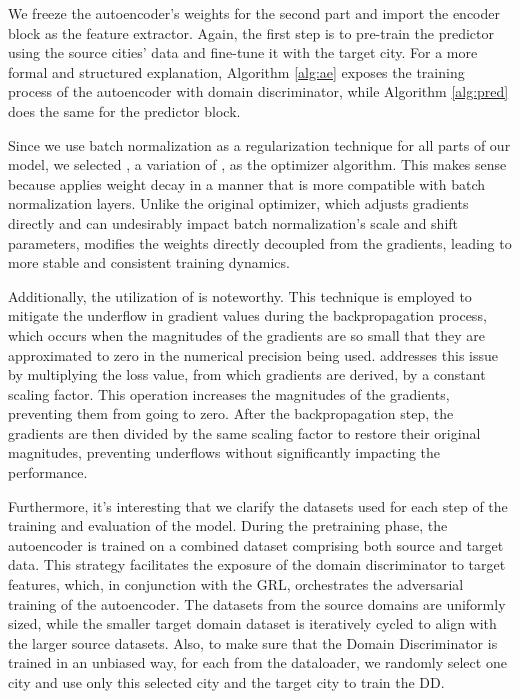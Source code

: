 We freeze the autoencoder's weights for the second part and import the encoder block as the feature extractor. Again, the first step is to pre-train the predictor using the source cities' data and fine-tune it with the target city. For a more formal and structured explanation, Algorithm \ref{alg:ae} exposes the training process of the autoencoder with domain discriminator, while Algorithm \ref{alg:pred} does the same for the predictor block.

Since we use batch normalization as a regularization technique for all parts of our model, we selected  \cite{abs-1711-05101}, a variation of , as the optimizer algorithm. This makes sense because  applies weight decay in a manner that is more compatible with batch normalization layers. Unlike the original  optimizer, which adjusts gradients directly and can undesirably impact batch normalization's scale and shift parameters,  modifies the weights directly decoupled from the gradients, leading to more stable and consistent training dynamics.

Additionally, the utilization of  is noteworthy. This technique is employed to mitigate the underflow in gradient values during the backpropagation process, which occurs when the magnitudes of the gradients are so small that they are approximated to zero in the numerical precision being used.  addresses this issue by multiplying the loss value, from which gradients are derived, by a constant scaling factor. This operation increases the magnitudes of the gradients, preventing them from going to zero. After the backpropagation step, the gradients are then divided by the same scaling factor to restore their original magnitudes, preventing underflows without significantly impacting the performance.

Furthermore, it's interesting that we clarify the datasets used for each step of the training and evaluation of the model. During the pretraining phase, the autoencoder is trained on a combined dataset comprising both source and target data. This strategy facilitates the exposure of the domain discriminator to target features, which, in conjunction with the \gls{GRL}, orchestrates the adversarial training of the autoencoder. The datasets from the source domains are uniformly sized, while the smaller target domain dataset is iteratively cycled to align with the larger source datasets. Also, to make sure that the Domain Discriminator is trained in an unbiased way, for each  from the dataloader, we randomly select one city and use only this selected city and the target city to train the \gls{DD}.

